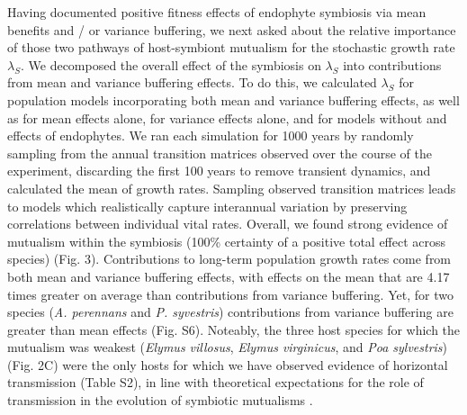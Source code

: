 \documentclass[12pt]{article}
\begin{document}
Having documented positive fitness effects of endophyte symbiosis via mean benefits and / or variance buffering, we next asked about the relative importance of those two pathways of host-symbiont mutualism for the stochastic growth rate $\lambda_{S}$.
We decomposed the overall effect of the symbiosis on $\lambda_{S}$ into contributions from mean and variance buffering effects.
To do this, we calculated $\lambda_{S}$ for population models incorporating both mean and variance buffering effects, as well as for mean effects alone, for variance effects alone, and for models without and effects of endophytes. 
We ran each simulation for 1000 years by randomly sampling from the annual transition matrices observed over the course of the experiment, discarding the first 100 years to remove transient dynamics, and calculated the mean of growth rates.  
Sampling observed transition matrices leads to models which realistically capture interannual variation by preserving correlations between individual vital rates.
Overall, we found strong evidence of mutualism within the symbiosis (100\% certainty of a positive total effect across species) (Fig. 3).
Contributions to long-term population growth rates come from both mean and variance buffering effects, with effects on the mean that are 4.17 times greater on average than contributions from variance buffering. 
Yet, for two species (\emph{A. perennans} and \emph{P. syvestris}) contributions from variance buffering are greater than mean effects (Fig. S6). 
Noteably, the three host species for which the mutualism was weakest (\emph{Elymus villosus}, \emph{Elymus virginicus}, and \emph{Poa sylvestris}) (Fig. 2C) were the only hosts for which we have observed evidence of horizontal transmission (Table S2), in line with theoretical expectations for the role of transmission in the evolution of symbiotic mutualisms \cite{fine1975vectors,afkhami2008symbiosis}.
\end{document}
